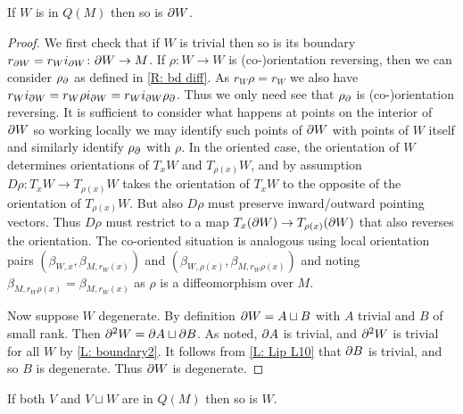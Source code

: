 \begin{lemma}\label{L: bd defined}
	If $W$ is in $Q(M)$ then so is $\partial W$.
\end{lemma}

\begin{proof}
	We first check that if $W$ is trivial then so is its boundary $r_{\partial W} = r_Wi_{\partial W} \colon \partial W \to M$.
	If $\rho \colon W \to W$ is (co\nobreakdash-)orientation reversing, then we can consider $\rho_\partial$ as defined in \cref{R: bd diff}.
	As $r_W\rho = r_W$ we also have $r_Wi_{\partial W} = r_W\rho i_{\partial W} = r_W i_{\partial W} \rho_\partial$.
	Thus we only need see that $\rho_\partial$ is (co\nobreakdash-)orientation reversing.
	It is sufficient to consider what happens at points on the interior of $\partial W$ so working locally we may identify such points of $\partial W$ with points of $W$ itself and similarly identify $\rho_\partial$ with $\rho$.
	In the oriented case, the orientation of $W$ determines orientations of $T_xW$ and $T_{\rho(x)}W$, and by assumption $D\rho: T_xW \to T_{\rho(x)}W$ takes the orientation of $T_xW$ to the opposite of the orientation of $T_{\rho(x)}W$.
	But also $D\rho$ must preserve inward/outward pointing vectors.
	Thus $D\rho$ must restrict to a map $T_x (\partial W) \to T_{\rho(x)}(\partial W)$ that also reverses the orientation.
	The co-oriented situation is analogous using local orientation pairs $\left(\beta_{W,x}, \beta_{M,r_W(x)}\right)$ and $\left(\beta_{W,\rho(x)}, \beta_{M,r_W\rho(x)}\right)$ and noting $\beta_{M,r_W\rho(x)} = \beta_{M,r_W(x)}$ as $\rho$ is a diffeomorphism over $M$.

	Now suppose $W$ degenerate.
	By definition $\partial W = A \sqcup B$ with $A$ trivial and $B$ of small rank.
	Then $\partial^2 W = \partial A \sqcup \partial B$.
	As noted, $\partial A$ is trivial, and $\partial^2 W$ is trivial for all $W$ by \cref{L: boundary2}.
	It follows from \cref{L: Lip L10} that $\partial B$ is trivial, and so $B$ is degenerate.
	Thus $\partial W$ is degenerate.
\end{proof}

\begin{lemma}\label{L: Lipy12}
	If both $V$ and $V \sqcup W$ are in $Q(M)$ then so is $W$.
\end{lemma}

